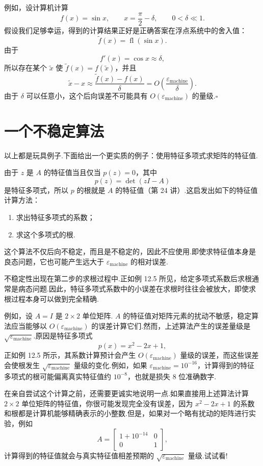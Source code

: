 \documentclass[UTF8,fontset=none,12pt]{ctexart}
\newcommand{\epsmach}{\varepsilon_{\mathrm{machine}}}
\newcommand{\fl}{\operatorname{fl}}
\theoremstyle{definition}
\begin{document}
例如，设计算机计算
\[
    f(x)=\sin x,\qquad x=\frac{\pi}{2}-\delta,\qquad 0<\delta\ll1.
\]
假设我们足够幸运，得到的计算结果正好是正确答案在浮点系统中的舍入值：
\[
    \widetilde f(x)=\fl(\sin x).
\]
由于
\[
    f'(x)=\cos x\approx\delta,
\]
所以存在某个 $\widetilde x$ 使 $\widetilde f(x)=f(\widetilde x)$，并且
\[
    \widetilde x-x
    \approx\frac{\widetilde f(x)-f(x)}{\delta}
    =O\left(\frac{\epsmach}{\delta}\right).
\]
由于 $\delta$ 可以任意小，这个后向误差不可能具有 $O(\epsmach)$ 的量级.\hfill$\square$

\section*{一个不稳定算法}

以上都是玩具例子.下面给出一个更实质的例子：使用特征多项式求矩阵的特征值.

由于 $z$ 是 $A$ 的特征值当且仅当 $p(z)=0$，其中
\[
    p(z)=\det(zI-A)
\]
是特征多项式，所以 $p$ 的根就是 $A$ 的特征值（第 24 讲）.这启发出如下的特征值计算方法：
\begin{enumerate}
    \item 求出特征多项式的系数；
    \item 求这个多项式的根.
\end{enumerate}

这个算法不仅后向不稳定，而且是不稳定的，因此不应使用.即使求特征值本身是良态问题，它也可能产生远大于 $\epsmach$ 的相对误差.

不稳定性出现在第二步的求根过程中.正如例 12.5 所见，给定多项式系数后求根通常是病态问题.因此，特征多项式系数中的小误差在求根时往往会被放大，即使求根过程本身可以做到完全精确.

例如，设 $A=I$ 是 $2\times2$ 单位矩阵. $A$ 的特征值对矩阵元素的扰动不敏感，稳定算法应当能够以 $O(\epsmach)$ 的误差计算它们.然而，上述算法产生的误差量级是 $\sqrt{\epsmach}$.原因是特征多项式
\[
    p(x)=x^2-2x+1,
\]
正如例 12.5 所示，其系数计算预计会产生 $O(\epsmach)$ 量级的误差，而这些误差会使根发生 $\sqrt{\epsmach}$ 量级的变化.例如，如果 $\epsmach=10^{-16}$，计算得到的特征多项式的根可能偏离真实特征值约 $10^{-8}$，也就是损失 8 位准确数字.

在亲自尝试这个计算之前，还需要更诚实地说明一点.如果直接用上述算法计算 $2\times2$ 单位矩阵的特征值，你很可能发现完全没有误差，因为 $x^2-2x+1$ 的系数和根都是计算机能够精确表示的小整数.但是，如果对一个略有扰动的矩阵进行实验，例如
\[
    A=
    \begin{bmatrix}
        1+10^{-14}&0\\
        0&1
    \end{bmatrix},
\]
计算得到的特征值就会与真实特征值相差预期的 $\sqrt{\epsmach}$ 量级.试试看!
\end{document}
